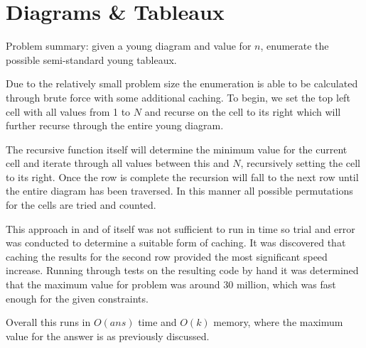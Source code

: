 \section{Diagrams \& Tableaux}

Problem summary: given a young diagram and value for $n$, enumerate the 
possible semi-standard young tableaux.

Due to the relatively small problem size the enumeration is able to be
calculated through brute force with some additional caching. To begin,
we set the top left cell with all values from 1 to $N$ and recurse on
the cell to its right which will further recurse through the entire
young diagram.

The recursive function itself will determine the minimum value for the
current cell and iterate through all values between this and $N$, 
recursively setting the cell to its right. Once the row is complete the
recursion will fall to the next row until the entire diagram has been
traversed. In this manner all possible permutations for the cells are
tried and counted.

This approach in and of itself was not sufficient to run in time so
trial and error was conducted to determine a suitable form of caching.
It was discovered that caching the results for the second row provided
the most significant speed increase. Running through tests on the
resulting code by hand it was determined that the maximum value for
problem was around 30 million, which was fast enough for the given
constraints.

Overall this runs in $O(ans)$ time and $O(k)$ memory, where the maximum
value for the answer is as previously discussed.
